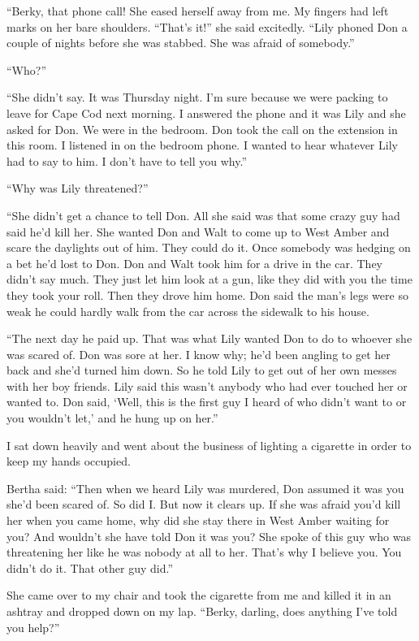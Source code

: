 \documentclass{novel}
\begin{document}
“Berky, that phone call! She eased herself away from me. My fingers had left marks on her bare shoulders. “That’s it!” she said excitedly. “Lily phoned Don a couple of nights before she was stabbed. She was afraid of somebody.”

“Who?”

“She didn’t say. It was Thursday night. I’m sure because we were packing to leave for Cape Cod next morning. I answered the phone and it was Lily and she asked for Don. We were in the bedroom. Don took the call on the extension in this room. I listened in on the bedroom phone. I wanted to hear whatever Lily had to say to him. I don’t have to tell you why.”

“Why was Lily threatened?”

“She didn’t get a chance to tell Don. All she said was that some crazy guy had said he’d kill her. She wanted Don and Walt to come up to West Amber and scare the daylights out of him. They could do it. Once somebody was hedging on a bet he’d lost to Don. Don and Walt took him for a drive in the car. They didn’t say much. They just let him look at a gun, like they did with you the time they took your roll. Then they drove him home. Don said the man’s legs were so weak he could hardly walk from the car across the sidewalk to his house. 

“The next day he paid up. That was what Lily wanted Don to do to whoever she was scared of. Don was sore at her. I know why; he’d been angling to get her back and she’d turned him down. So he told Lily to get out of her own messes with her boy friends. Lily said this wasn’t anybody who had ever touched her or wanted to. Don said, ‘Well, this is the first guy I heard of who didn’t want to or you wouldn’t let,’ and he hung up on her.”

I sat down heavily and went about the business of lighting a cigarette in order to keep my hands occupied.

Bertha said: “Then when we heard Lily was murdered, Don assumed it was you she’d been scared of. So did I. But now it clears up. If she was afraid you’d kill her when you came home, why did she stay there in West Amber waiting for you? And wouldn’t she have told Don it was you? She spoke of this guy who was threatening her like he was nobody at all to her. That’s why I believe you. You didn’t do it. That other guy did.”

She came over to my chair and took the cigarette from me and killed it in an ashtray and dropped down on my lap. “Berky, darling, does anything I’ve told you help?”
\end{document}
